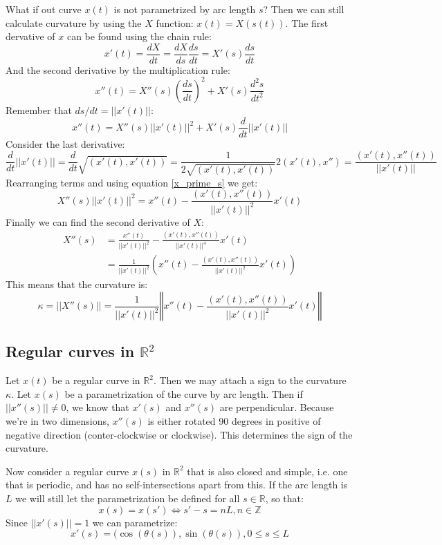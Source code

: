 \documentclass[12pt, a4paper]{article}
\numberwithin{equation}{section}
\begin{document}
What if out curve $x(t)$ is not parametrized by arc length $s$? Then we can still calculate curvature by using the $X$ function: $x(t)=X(s(t))$. The first dervative of $x$ can be found using the chain rule:
\begin{equation}
x'(t)=\frac{dX}{dt}=\frac{dX}{ds}\frac{ds}{dt}=X'(s)\frac{ds}{dt}
\end{equation}
And the second derivative by the multiplication rule:
\begin{equation}
x''(t)=X''(s)\left(\frac{ds}{dt}\right)^2+X'(s)\frac{d^2s}{dt^2}
\end{equation}
Remember that $ds/dt=||x'(t)||$:
\begin{equation}
x''(t)=X''(s)||x'(t)||^2+X'(s)\frac{d}{dt}||x'(t)||
\end{equation}
Consider the last derivative:
\begin{equation}
\frac{d}{dt}||x'(t)||=\frac{d}{dt}\sqrt{(x'(t),x'(t))}=\frac{1}{2\sqrt{(x'(t),x'(t))}}2(x'(t),x'')=\frac{(x'(t),x''(t))}{||x'(t)||}
\end{equation}
Rearranging terms and using equation \ref{x_prime_s} we get:
\begin{equation}
X''(s)||x'(t)||^2=x''(t)-\frac{(x'(t),x''(t))}{||x'(t)||^2}x'(t)
\end{equation}
Finally we can find the second derivative of $X$:
\begin{align}
X''(s)&=\frac{x''(t)}{||x'(t)||^2}-\frac{(x'(t),x''(t))}{||x'(t)||^4}x'(t)\\
&=\frac{1}{||x'(t)||^2}\left(x''(t)-\frac{(x'(t),x''(t))}{||x'(t)||^2}x'(t)\right)
\end{align}
This means that the curvature is:
\begin{equation}
\kappa=||X''(s)||=\frac{1}{||x'(t)||^2}\left\Vert x''(t)-\frac{(x'(t),x''(t))}{||x'(t)||^2}x'(t)\right\Vert
\end{equation}

\subsection{Regular curves in $\mathbb{R}^2$}
Let $x(t)$ be a regular curve in $\mathbb{R}^2$. Then we may attach a sign to the curvature $\kappa$. Let $x(s)$ be a parametrization of the curve by arc length. Then if $||x''(s)||\neq 0$, we know that $x'(s)$ and $x''(s)$ are perpendicular. Because we're in two dimensions, $x''(s)$ is either rotated 90 degrees in positive of negative direction (conter-clockwise or clockwise). This determines the sign of the curvature.

Now consider a regular curve $x(s)$ in $\mathbb{R}^2$ that is also closed and simple, i.e. one that is periodic, and has no self-intersections apart from this. If the arc length is $L$ we will still let the parametrization be defined for all $s\in\mathbb{R}$, so that:
\begin{equation}
x(s)=x(s')\Leftrightarrow s'-s=nL, n\in\mathbb{Z}
\end{equation}
Since $||x'(s)||=1$ we can parametrize:
\begin{equation}
x'(s)=(\cos(\theta(s)),\sin(\theta(s)), 0\le s\le L
\end{equation}
\end{document}
